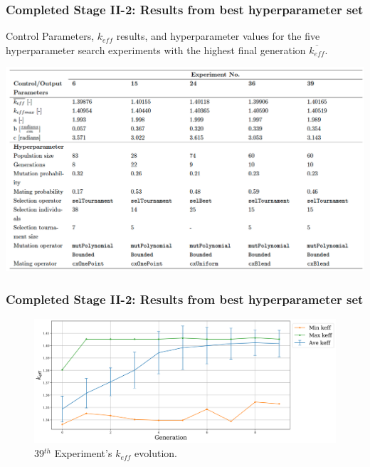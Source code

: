 
\begin{frame}
    \frametitle{Completed Stage II-2: Results from best hyperparameter set}
    \begin{table}
        \caption{Control Parameters, $k_{eff}$ results, and hyperparameter values for 
        the five hyperparameter search experiments with the highest final generation 
        $\overline{k_{eff}}$.}
        \includegraphics[width=0.85\linewidth]{figures/rollo-demo-best.png} 
    \end{table}
\end{frame}

\begin{frame}
    \frametitle{Completed Stage II-2: Results from best hyperparameter set}
    \begin{figure}[]
        \centering
        \includegraphics[width=\linewidth]{../docs/figures/keff_conv_39.png}
        \caption{39$^{th}$ Experiment's $k_{eff}$ evolution.}
    \end{figure}
\end{frame}

